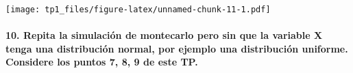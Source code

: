 \documentclass[
]{article}
\begin{document}
\texttt{[image: tp1\_files/figure-latex/unnamed-chunk-11-1.pdf]}

\hypertarget{repita-la-simulaciuxf3n-de-montecarlo-pero-sin-que-la-variable-x-tenga-una-distribuciuxf3n-normal-por-ejemplo-una-distribuciuxf3n-uniforme.-considere-los-puntos-7-8-9-de-este-tp.}{%
\paragraph{10. Repita la simulación de montecarlo pero sin que la
variable X tenga una distribución normal, por ejemplo una distribución
uniforme. Considere los puntos 7, 8, 9 de este
TP.}\label{repita-la-simulaciuxf3n-de-montecarlo-pero-sin-que-la-variable-x-tenga-una-distribuciuxf3n-normal-por-ejemplo-una-distribuciuxf3n-uniforme.-considere-los-puntos-7-8-9-de-este-tp.}}
\end{document}
